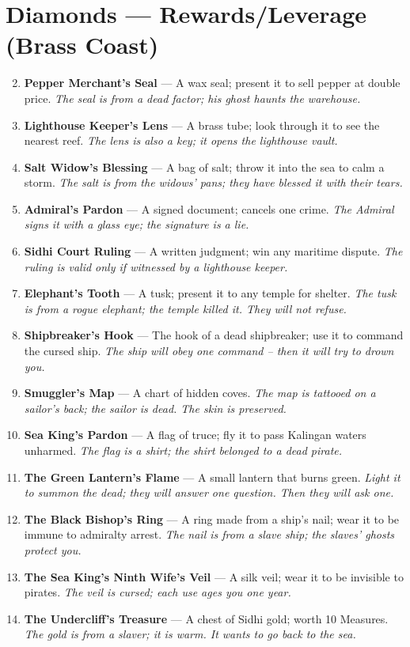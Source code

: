 \documentclass[11pt]{book}
\begin{document}
\section*{Diamonds — Rewards/Leverage (Brass Coast)}
\begin{enumerate}
\setcounter{enumi}{1}
\item \textbf{Pepper Merchant’s Seal} — A wax seal; present it to sell pepper at double price. \textit{The seal is from a dead factor; his ghost haunts the warehouse.}
\item \textbf{Lighthouse Keeper’s Lens} — A brass tube; look through it to see the nearest reef. \textit{The lens is also a key; it opens the lighthouse vault.}
\item \textbf{Salt Widow’s Blessing} — A bag of salt; throw it into the sea to calm a storm. \textit{The salt is from the widows’ pans; they have blessed it with their tears.}
\item \textbf{Admiral’s Pardon} — A signed document; cancels one crime. \textit{The Admiral signs it with a glass eye; the signature is a lie.}
\item \textbf{Sidhi Court Ruling} — A written judgment; win any maritime dispute. \textit{The ruling is valid only if witnessed by a lighthouse keeper.}
\item \textbf{Elephant’s Tooth} — A tusk; present it to any temple for shelter. \textit{The tusk is from a rogue elephant; the temple killed it. They will not refuse.}
\item \textbf{Shipbreaker’s Hook} — The hook of a dead shipbreaker; use it to command the cursed ship. \textit{The ship will obey one command – then it will try to drown you.}
\item \textbf{Smuggler’s Map} — A chart of hidden coves. \textit{The map is tattooed on a sailor’s back; the sailor is dead. The skin is preserved.}
\item \textbf{Sea King’s Pardon} — A flag of truce; fly it to pass Kalingan waters unharmed. \textit{The flag is a shirt; the shirt belonged to a dead pirate.}
\item[J] \textbf{The Green Lantern’s Flame} — A small lantern that burns green. \textit{Light it to summon the dead; they will answer one question. Then they will ask one.}
\item[Q] \textbf{The Black Bishop’s Ring} — A ring made from a ship’s nail; wear it to be immune to admiralty arrest. \textit{The nail is from a slave ship; the slaves’ ghosts protect you.}
\item[K] \textbf{The Sea King’s Ninth Wife’s Veil} — A silk veil; wear it to be invisible to pirates. \textit{The veil is cursed; each use ages you one year.}
\item[A] \textbf{The Undercliff’s Treasure} — A chest of Sidhi gold; worth 10 Measures. \textit{The gold is from a slaver; it is warm. It wants to go back to the sea.}
\end{enumerate}
\end{document}
